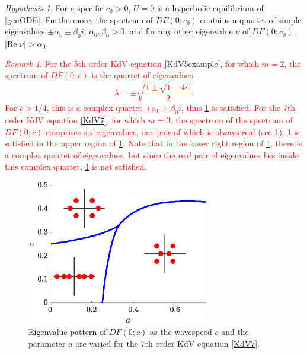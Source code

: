 \documentclass[12pt]{elsarticle}
\theoremstyle{plain}
\theoremstyle{definition}
\theoremstyle{remark}
\newtheorem{remark}[theorem]{Remark}
\newtheorem{hypothesis}[theorem]{Hypothesis}
\numberwithin{theorem}{section}
\numberwithin{equation}{section}
\newcommand{\revised}[1]{ \textcolor{red}{#1} }
\begin{document}
\begin{hypothesis}\label{hyp:hypeq}
For a specific $c_0 > 0$, $U = 0$ is a hyperbolic equilibrium of \cref{genODE}. Furthermore, the spectrum of $DF(0; c_0)$ contains a quartet of simple eigenvalues $\pm \alpha_0 \pm \beta_0 i$, $\alpha_0, \beta_0 > 0$, and for any other eigenvalue $\nu$ of $DF(0; c_0)$, $|\text{Re }\nu| > \alpha_0$.
\end{hypothesis}

\revised{
\begin{remark}\label{remark:hypsatisfied}
For the 5th order KdV equation \cref{KdV5example}, for which $m=2$, the spectrum of $DF(0; c)$ is the quartet of eigenvalues 
\[
\lambda = \pm \sqrt{ \frac{1 \pm \sqrt{1 - 4c } }{ 2} }.
\] 
For $c > 1/4$, this is a complex quartet $\pm \alpha_0 \pm \beta_0 i$, thus \cref{hyp:hypeq} is satisfied. For the 7th order KdV equation \cref{KdV7}, for which $m=3$, the spectrum of the spectrum of $DF(0; c)$ comprises six eigenvalues, one pair of which is always real (see \cref{fig:KdV7spec}). \cref{hyp:hypeq} is satisfied in the upper region of \cref{fig:KdV7spec}. Note that in the lower right region of \cref{fig:KdV7spec}, there is a complex quartet of eigenvalues, but since the real pair of eigenvalues lies inside this complex quartet, \cref{hyp:hypeq} is not satisfied.
\end{remark}
}

\begin{figure}
\begin{center}
\includegraphics[width=8cm]{images/kdv7bgspec}
\end{center}
\caption{Eigenvalue pattern of $DF(0; c)$ as the wavespeed $c$ and the parameter $a$ are varied for the 7th order KdV equation \cref{KdV7}.}
\label{fig:KdV7spec}
\end{figure}
\end{document}
